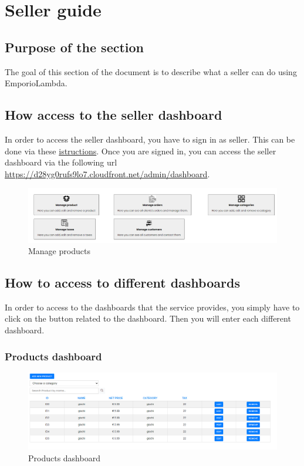 \section{Seller guide} \label{_venditore}
\subsection{Purpose of the section}
The goal of this section of the document is to describe what a seller can do using EmporioLambda.

\subsection{How access to the seller dashboard} \label{_adminlogin}
In order to access the seller dashboard, you have to sign in as seller. This can be done via these \hyperref[_signin]{istructions}.
Once you are signed in, you can access the seller dashboard via the following url \url{https://d28yg0rufs9lo7.cloudfront.net/admin/dashboard}.
\begin{figure}[H]
    \centering
    \includegraphics[width=\linewidth]{res/images/venditore/dashboard.png}
    \caption{Manage products}
\end{figure}

\subsection{How to access to different dashboards} \label{_dashboard}
In order to access to the dashboards that the service provides, you simply have to click on the button related to the dashboard. Then you will enter each different dashboard.

\subsubsection{Products dashboard} \label{_productmanagement}
\begin{figure}[H]
    \centering
    \includegraphics[width=\linewidth]{res/images/venditore/productmanagement.png}
    \caption{Products dashboard}
\end{figure}

